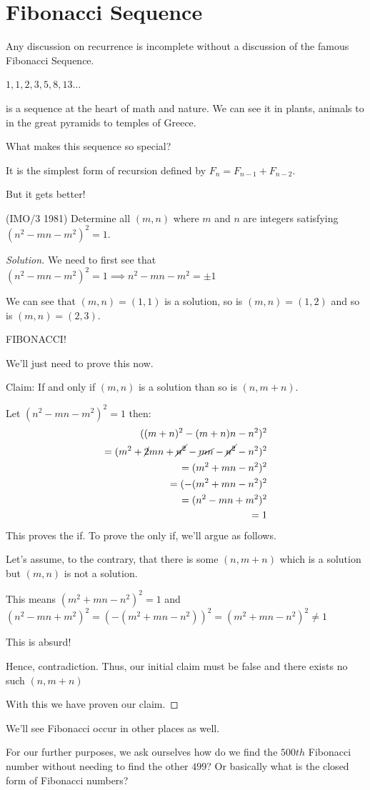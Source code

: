 \section{Fibonacci Sequence}
Any discussion on recurrence is incomplete without a discussion of the famous Fibonacci Sequence.\par
$1,1,2,3,5,8,13 \dots$ \par is a sequence at the heart of math and nature. 
We can see it in plants, animals to in the great pyramids to temples of Greece.\par
What makes this sequence so special?\par
It is the simplest form of recursion defined by $F_n=F_{n-1}+F_{n-2}$.\par
But it gets better!\par
\begin{example}
(IMO/3 1981) Determine all $(m,n)$ where $\displaystyle m$ 
and $\displaystyle n$ are integers satisfying 
$\displaystyle ( n^2 - mn - m^2 )^2 = 1$.
\end{example}
\begin{proof}
    [Solution]
We need to first see that $(n^2-mn-m^2)^2=1 \implies n^2-mn-m^2=\pm1$\par 
We can see that  $(m,n)=(1,1)$ is a solution, so is $(m,n)=(1,2)$ and so is $(m,n)=(2,3)$.\par
FIBONACCI!\par
We'll just need to prove this now.\par
Claim: If and only if $(m,n)$ is a solution than so is $(n,m+n)$.\par
Let $(n^2-mn-m^2)^2=1$ then:
\begin{align*}
((m+n)^2-(m+n)n-n^2)^2\\
=(m^2+\cancel{2}mn+\cancel{n^2}-\cancel{mn}-\cancel{n^2}-n^2)^2\\
=(m^2+mn-n^2)^2\\
= (-(m^2+mn-n^2)^2\\
= (n^2-mn+m^2)^2\\
=1
\end{align*}
This proves the if. To prove the only if, we'll argue as follows.\par
Let's assume, to the contrary, that there is some $(n,m+n)$ which is a solution but $(m,n)$ is not a solution.\par
This means $(m^2+mn-n^2)^2=1$  and $(n^2-mn+m^2)^2 = (-(m^2+mn-n^2))^2 = (m^2+mn-n^2)^2 \neq 1$\par
This is absurd!\par
Hence, contradiction. Thus, our initial claim must be false and there exists no such $(n,m+n)$\par
With this we have proven our claim.
\end{proof}
We'll see Fibonacci occur in other places as well.\par
For our further purposes, we ask ourselves how do we find the 
$500th$ Fibonacci number without needing to find the other $499$? 
Or basically what is the closed form of Fibonacci numbers?
